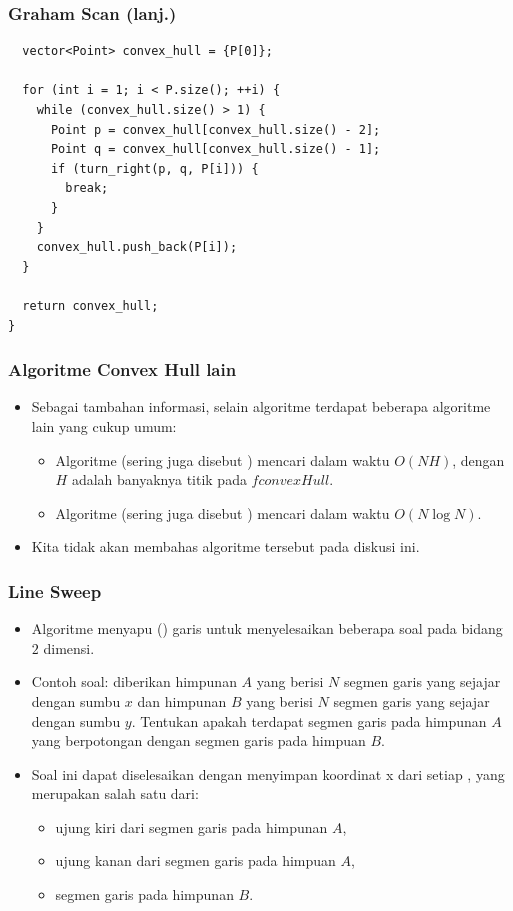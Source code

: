 \begin{frame}[fragile]
\frametitle{Graham Scan (lanj.)}
\begin{lstlisting}
  vector<Point> convex_hull = {P[0]};

  for (int i = 1; i < P.size(); ++i) {
    while (convex_hull.size() > 1) {
      Point p = convex_hull[convex_hull.size() - 2];
      Point q = convex_hull[convex_hull.size() - 1];
      if (turn_right(p, q, P[i])) {
        break;
      }
    }
    convex_hull.push_back(P[i]);
  }

  return convex_hull;
}
\end{lstlisting}
\end{frame}

\begin{frame}
\frametitle{Algoritme Convex Hull lain}
\begin{itemize}
  \item Sebagai tambahan informasi, selain algoritme \fGrahamScan terdapat beberapa algoritme lain yang cukup umum:
  \begin{itemize}
    \item Algoritme  (sering juga disebut ) mencari \fconvexHull dalam waktu $O(NH)$, dengan $H$ adalah banyaknya titik pada $fconvexHull$.
    \item Algoritme  (sering juga disebut ) mencari \fconvexHull dalam waktu $O(N \log N)$.
  \end{itemize}
  \item Kita tidak akan membahas algoritme tersebut pada diskusi ini.
\end{itemize}
\end{frame}

\begin{frame}[fragile]
\frametitle{Line Sweep}
\begin{itemize}
  \item Algoritme  menyapu (\xspace) garis untuk menyelesaikan beberapa soal pada bidang $2$ dimensi.
  \item Contoh soal: diberikan himpunan $A$ yang berisi $N$ segmen garis yang sejajar dengan sumbu $x$ dan himpunan $B$ yang berisi $N$ segmen garis yang sejajar dengan sumbu $y$. Tentukan apakah terdapat segmen garis pada himpunan $A$ yang berpotongan dengan segmen garis pada himpuan $B$.
  \item Soal ini dapat diselesaikan dengan menyimpan koordinat x dari setiap , yang merupakan salah satu dari:
  \begin{itemize}
    \item ujung kiri dari segmen garis pada himpunan $A$,
    \item ujung kanan dari segmen garis pada himpuan $A$,
    \item segmen garis pada himpunan $B$.
  \end{itemize}
\end{itemize}
\end{frame}

